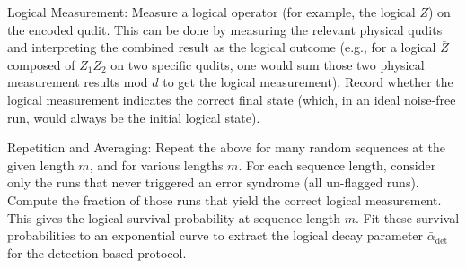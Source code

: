 Logical Measurement: Measure a logical operator (for example, the logical
$Z$) on the encoded qudit. This can be done by measuring the relevant
physical qudits and interpreting the combined result as the logical
outcome (e.g., for a logical $\bar{Z}$ composed of $Z_1 Z_2$ on two
specific qudits, one would sum those two physical measurement results
mod $d$ to get the logical measurement). Record whether the logical
measurement indicates the correct final state (which, in an ideal
noise-free run, would always be the initial logical state).

Repetition and Averaging: Repeat the above for many random sequences at
the given length $m$, and for various lengths $m$. For each sequence
length, consider only the runs that never triggered an error syndrome
(all un-flagged runs). Compute the fraction of those runs that yield the
correct logical measurement. This gives the logical survival probability
at sequence length $m$. Fit these survival probabilities to an
exponential curve to extract the logical decay parameter
$\bar{\alpha}_{\text{det}}$ for the detection-based protocol.

